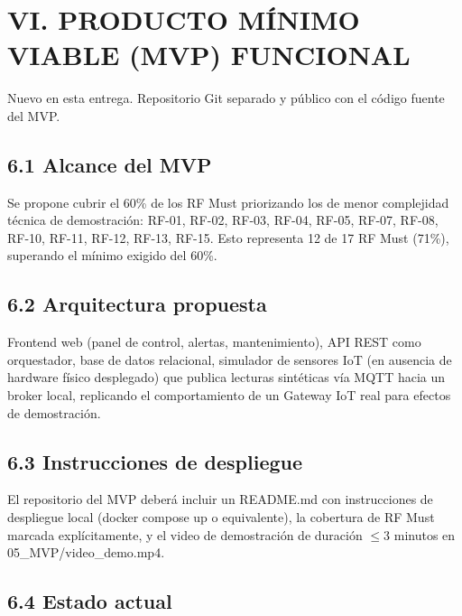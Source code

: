 \section*{VI. PRODUCTO MÍNIMO VIABLE (MVP) FUNCIONAL}


Nuevo en esta entrega. Repositorio Git separado y público con el código fuente del MVP.


\subsection*{6.1 Alcance del MVP}


Se propone cubrir el 60\% de los RF Must priorizando los de menor complejidad técnica de demostración: RF-01, RF-02, RF-03, RF-04, RF-05, RF-07, RF-08, RF-10, RF-11, RF-12, RF-13, RF-15. Esto representa 12 de 17 RF Must (71\%), superando el mínimo exigido del 60\%.


\subsection*{6.2 Arquitectura propuesta}


Frontend web (panel de control, alertas, mantenimiento), API REST como orquestador, base de datos relacional, simulador de sensores IoT (en ausencia de hardware físico desplegado) que publica lecturas sintéticas vía MQTT hacia un broker local, replicando el comportamiento de un Gateway IoT real para efectos de demostración.


\subsection*{6.3 Instrucciones de despliegue}


El repositorio del MVP deberá incluir un README.md con instrucciones de despliegue local (docker compose up o equivalente), la cobertura de RF Must marcada explícitamente, y el video de demostración de duración $\leq$3 minutos en 05\_MVP/video\_demo.mp4.


\subsection*{6.4 Estado actual}

